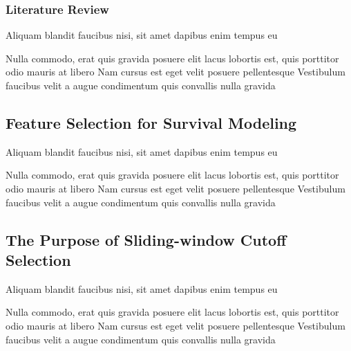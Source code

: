 \documentclass[
paper=landscape,
paper=160mm:90mm, %
fontsize=11pt, %
pagesize, %
parskip=half-, %
]{scrartcl} %
\theoremstyle{mythmstyle} %
\begin{document}
\clearpage

\subsubsection*{Literature Review} %

\begin{outline}

\1 Aliquam blandit faucibus nisi, sit amet dapibus enim tempus eu

\2 Nulla commodo, erat quis gravida posuere
\1 elit lacus lobortis est, quis porttitor odio mauris at libero
\1 Nam cursus est eget velit posuere pellentesque
\1 Vestibulum faucibus velit a augue condimentum quis convallis nulla gravida

\end{outline}


\clearpage

\subsection{Feature Selection for Survival Modeling} %

\begin{outline}

\1 Aliquam blandit faucibus nisi, sit amet dapibus enim tempus eu

\2 Nulla commodo, erat quis gravida posuere
\1 elit lacus lobortis est, quis porttitor odio mauris at libero
\1 Nam cursus est eget velit posuere pellentesque
\1 Vestibulum faucibus velit a augue condimentum quis convallis nulla gravida

\end{outline}


\clearpage

\subsection{The Purpose of Sliding-window Cutoff Selection}

\begin{outline}

\1 Aliquam blandit faucibus nisi, sit amet dapibus enim tempus eu

\2 Nulla commodo, erat quis gravida posuere
\1 elit lacus lobortis est, quis porttitor odio mauris at libero
\1 Nam cursus est eget velit posuere pellentesque
\1 Vestibulum faucibus velit a augue condimentum quis convallis nulla gravida

\end{outline}
\end{document}
